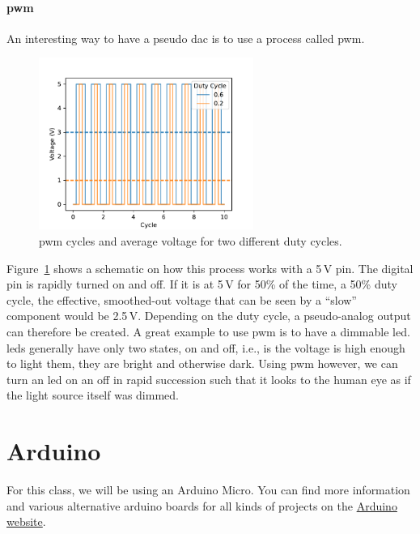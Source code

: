 \paragraph{\Ac{pwm}} An interesting way to have a pseudo \ac{dac} is to use a process called \acf{pwm}. 
\begin{figure}[tb]
    \centering
    \includegraphics[width=0.625\textwidth]{graphics/00_introduction/pwm.pdf}
    \caption{\Ac{pwm} cycles and average voltage for two different duty cycles.}
    \label{fig:intro:pwm}
\end{figure}
Figure~\ref{fig:intro:pwm} shows a schematic on how this process works with a 5\,V pin. The digital pin is rapidly turned on and off. If it is at 5\,V for 50\% of the time, a 50\% duty cycle, the effective, smoothed-out voltage that can be seen by a ``slow'' component would be 2.5\,V. Depending on the duty cycle, a pseudo-analog output can therefore be created. A great example to use \ac{pwm} is to have a dimmable \ac{led}. \acp{led} generally have only two states, on and off, i.e., is the voltage is high enough to light them, they are bright and otherwise dark. Using \ac{pwm} however, we can turn an \ac{led} on an off in rapid succession such that it looks to the human eye as if the light source itself was dimmed.


\section{Arduino}

For this class, we will be using an Arduino Micro. You can find more information and various alternative arduino boards for all kinds of projects on the \href{https://www.arduino.cc}{Arduino website}.

